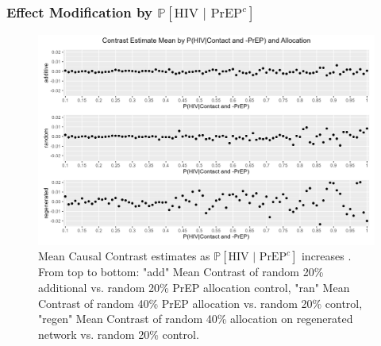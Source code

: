 \documentclass{article}
\theoremstyle{definition}
\begin{document}
\subsubsection{Effect Modification by $\mathbb{P}\left[\text{HIV } \vert \text{ PrEP}^{c}\right]$}
\begin{figure}[H]
    \centering
    \includegraphics[scale=0.75]{Figures/p1 Mean plots.png}
    \caption{Mean Causal Contrast estimates as $\mathbb{P}\left[\text{HIV } \vert \text{ PrEP}^{c}\right]$ increases . From top to bottom: "add" Mean Contrast of random 20\% additional vs. random 20\% PrEP allocation control, "ran" Mean Contrast of random 40\% PrEP allocation vs. random 20\% control, "regen" Mean Contrast of random 40\% allocation on regenerated network vs. random 20\% control.}
    \label{fig:Figure 13}
\end{figure}
\end{document}
